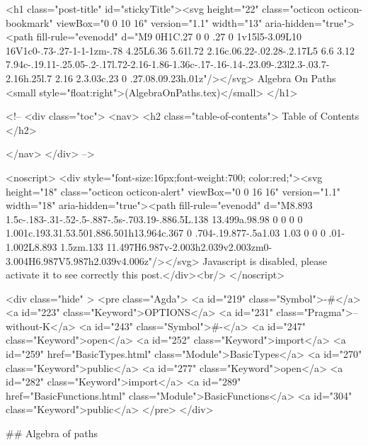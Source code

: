   <h1 class="post-title" id="stickyTitle"><svg height="22" class="octicon octicon-bookmark" viewBox="0 0 10 16" version="1.1" width="13" aria-hidden="true"><path fill-rule="evenodd" d="M9 0H1C.27 0 0 .27 0 1v15l5-3.09L10 16V1c0-.73-.27-1-1-1zm-.78 4.25L6.36 5.61l.72 2.16c.06.22-.02.28-.2.17L5 6.6 3.12 7.94c-.19.11-.25.05-.2-.17l.72-2.16-1.86-1.36c-.17-.16-.14-.23.09-.23l2.3-.03.7-2.16h.25l.7 2.16 2.3.03c.23 0 .27.08.09.23h.01z"/></svg> Algebra On Paths <small style="float:right">(AlgebraOnPaths.tex)</small>
  </h1>

  <!-- 
  <div class="toc">
    <nav>
    <h2 class="table-of-contents"> Table of Contents </h2>
      

    </nav>
  </div>
   -->

  <noscript>
  <div style="font-size:16px;font-weight:700; color:red;"><svg height="18" class="octicon octicon-alert" viewBox="0 0 16 16" version="1.1" width="18" aria-hidden="true"><path fill-rule="evenodd" d="M8.893 1.5c-.183-.31-.52-.5-.887-.5s-.703.19-.886.5L.138 13.499a.98.98 0 0 0 0 1.001c.193.31.53.501.886.501h13.964c.367 0 .704-.19.877-.5a1.03 1.03 0 0 0 .01-1.002L8.893 1.5zm.133 11.497H6.987v-2.003h2.039v2.003zm0-3.004H6.987V5.987h2.039v4.006z"/></svg> Javascript is disabled, please activate it to see correctly this post.</div><br/>
  </noscript>

  <div class="hide" >
<pre class="Agda">
<a id="219" class="Symbol">{-#</a> <a id="223" class="Keyword">OPTIONS</a> <a id="231" class="Pragma">--without-K</a> <a id="243" class="Symbol">#-}</a>
<a id="247" class="Keyword">open</a> <a id="252" class="Keyword">import</a> <a id="259" href="BasicTypes.html" class="Module">BasicTypes</a> <a id="270" class="Keyword">public</a>
<a id="277" class="Keyword">open</a> <a id="282" class="Keyword">import</a> <a id="289" href="BasicFunctions.html" class="Module">BasicFunctions</a> <a id="304" class="Keyword">public</a>
</pre>
</div>

## Algebra of paths

